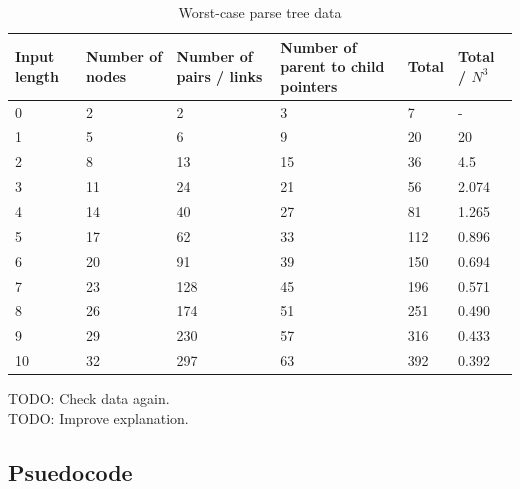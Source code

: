 \documentclass[a4paper,10pt]{article}
\begin{document}
\begin{table}[H]
\centering
\begin{tabular}{ | p{4em} | p{4em} | p{4em} | p{5em} | p{4em} | p{4em} | }
  \hline
  Input length & Number of nodes & Number of pairs / links & Number of parent to child pointers & Total & Total / $N^{3}$ \\
  \hline
  0 & 2 & 2 & 3 & 7 & - \\
  1 & 5 & 6 & 9 & 20 & 20 \\
  2 & 8 & 13 & 15 & 36 & 4.5 \\
  3 & 11 & 24 & 21 & 56 & 2.074 \\
  4 & 14 & 40 & 27 & 81 & 1.265 \\
  5 & 17 & 62 & 33 & 112 & 0.896 \\
  6 & 20 & 91 & 39 & 150 & 0.694 \\
  7 & 23 & 128 & 45 & 196 & 0.571 \\
  8 & 26 & 174 & 51 & 251 & 0.490 \\
  9 & 29 & 230 & 57 & 316 & 0.433 \\
  10 & 32 & 297 & 63 & 392 & 0.392 \\
  \hline
\end{tabular}
\caption{Worst-case parse tree data}
\end{table}

TODO: Check data again.\\
TODO: Improve explanation.

\subsection{Psuedocode}
\end{document}
